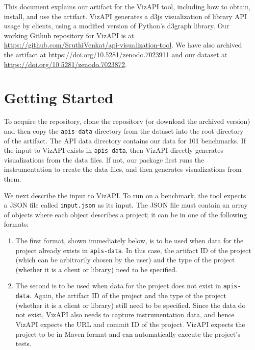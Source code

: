 This document explains our artifact for the VizAPI tool, including how to obtain, install, and use the artifact. VizAPI generates a d3js visualization of library API usage by clients, using a modified version of Python's d3graph library. Our working Github repository for VizAPI is at \href{https://github.com/SruthiVenkat/api-visualization-tool}{https://github.com/SruthiVenkat/api-visualization-tool}. We have also archived the artifact at \href{https://doi.org/10.5281/zenodo.7023911}{https://doi.org/10.5281/zenodo.7023911} and our dataset at \href{https://doi.org/10.5281/zenodo.7023872}{https://doi.org/10.5281/zenodo.7023872}.

\section{Getting Started}

To acquire the repository, clone the repository (or download the archived version) and then copy the \texttt{apis-data} directory from the dataset into the root directory of the artifact. The API data directory contains our data for 101 benchmarks. If the input to VizAPI exists in \texttt{apis-data}, then VizAPI directly generates visualizations from the data files. If not, our package first runs the instrumentation to create the data files, and then generates visualizations from them.

We next describe the input to VizAPI. To run on a benchmark, the tool expects a JSON file called \texttt{input.json} as its input. The JSON file must contain an array of objects where each object describes a project; it can be in one of the following formats:

\begin{enumerate}
\item The first format, shown immediately below, is to be used when data for the project already exists in \texttt{apis-data}. In this case, the artifact ID of the project (which can be arbitrarily chosen by the user) and the type of the project (whether it is a client or library) need to be specified.

\item The second is to be used when data for the project does not exist in \texttt{apis-data}. Again, the artifact ID of the project and the type of the project (whether it is a client or library) still need to be specified. Since the data do not exist, VizAPI also needs to capture instrumentation data, and hence VizAPI expects the URL and commit ID of the project. VizAPI expects the project to be in Maven format and can automatically execute the project's tests.

\end{enumerate}

